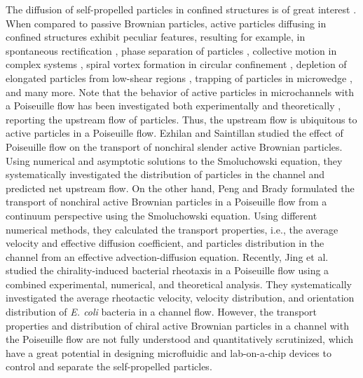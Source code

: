 \documentclass[aps,pre,preprint,superscriptaddress,amsmath,amssymb,nofootinbib]{revtex4}
\begin{document}
The diffusion of self-propelled particles in confined structures is of great interest \cite{Ghosh_PRL, Ao_EPL, Ai_PRE}. 
When compared to passive Brownian particles, active particles diffusing in confined structures exhibit peculiar features, resulting  for example, in spontaneous rectification \cite{Ghosh_PRL, Ai_PRE, Angelani_PRL}, phase separation of particles \cite{Speck_PRL, Fily_PRL}, collective motion in complex systems \cite{Vicsek_PR, Vicsek_Nature}, spiral vortex formation in circular confinement \cite{Dunkel_PRL}, depletion of elongated particles from low-shear regions \cite{Stocker_Nature}, trapping of particles in microwedge \cite{Kaiser_PRL}, and many more.
Note that the behavior of active particles in microchannels with a Poiseuille flow has been investigated both experimentally \cite{Hill_et_al@PRL:2007, Kaya_Koser, Kantsler_et_al@Elife:2014, Jing_et_al@SA:2020} and theoretically \cite{Jing_et_al@SA:2020, Zottl_Stark@PRL:2012, Ezhilan_Saintillan@JFM:2015, Vennamneni_et_al@JFM:2020, Costanzo_JPCM, Nash_PRL, Stark_EPJE, Stark_EPJSP, Shendruk_PRL, Peng_PRF, Chilukuri_PF}, reporting the upstream flow of particles.
Thus, the upstream flow is ubiquitous to active particles in a Poiseuille flow.
Ezhilan and Saintillan \cite{ Ezhilan_Saintillan@JFM:2015} studied the effect of Poiseuille flow on the transport of nonchiral slender active Brownian particles. 
Using numerical and asymptotic solutions to the Smoluchowski equation, they systematically investigated the distribution of particles in the channel and predicted net upstream flow. 
On the other hand, Peng and Brady \cite{Peng_PRF} formulated the transport of nonchiral active Brownian particles in a Poiseuille flow from a continuum perspective using the Smoluchowski equation.
Using different numerical methods, they calculated the transport properties, i.e., the average velocity and effective diffusion coefficient, and particles distribution in the channel from an effective advection-diffusion equation.
Recently, Jing et al. \cite{Jing_et_al@SA:2020} studied the chirality-induced bacterial rheotaxis in a Poiseuille flow using a combined experimental, numerical, and theoretical analysis.
They systematically investigated the average rheotactic velocity, velocity distribution, and orientation distribution of \textit{E. coli} bacteria in a channel flow.
However, the transport properties and distribution of chiral active Brownian particles in a channel with the Poiseuille flow are not fully understood and quantitatively scrutinized, which have a great potential in  
designing microfluidic and lab-on-a-chip devices to control and separate the self-propelled particles.  
\end{document}
